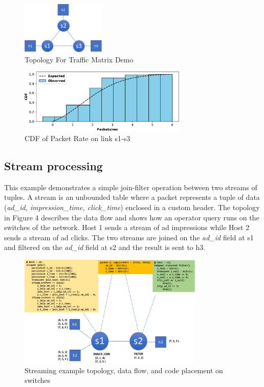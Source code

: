 \begin{figure}[tp]
\centering
\includegraphics[width=40mm,scale=0.7]{figures/traf_mat_topo}
\caption{Topology For Traffic Matrix Demo}
\end{figure}


\begin{figure}[tp]
\centering
\includegraphics[width=80mm,scale=0.7]{figures/exp_obs_cdf}
\caption{CDF of Packet Rate on link s1-s3}
\end{figure}
  \vspace{-4mm}

\subsection{Stream processing}
This example demonstrates a simple join-filter operation between two streams of
tuples. A stream is an unbounded table where a packet represents a tuple of
data (\textit{ad\_id, impression\_time, click\_time}) enclosed in a custom
header. The topology in Figure 4 describes the data flow and shows how an
operator query runs on the switches of the network. Host 1 sends a stream of ad
impressions while Host 2 sends a stream of ad clicks. The two streams are
joined on the \textit{ad\_id} field at s1 and filtered on the \textit{ad\_id}
field at s2 and the result is sent to h3. 

\begin{figure}[tp]
\centering
\includegraphics[width=88mm]{figures/streaming_example}
\caption{Streaming example topology, data flow, and code placement on switches}
\vspace{-5mm}
\end{figure}
\vspace{-5mm}


